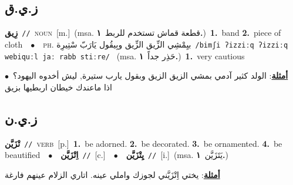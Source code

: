 \documentclass[10pt,a4paper,twoside]{article} %
\begin{document}
\begin{multicols}{2}
\vspace{-3mm}
\subsection*{\color{blue}\foreignlanguage{arabic}{ز.ي.ق}\color{blue}{}} 

{\setlength\topsep{0pt}\textbf{\foreignlanguage{arabic}{زِيق}}\ {\color{gray}\texttt{//}\color{black}}\ \textsc{noun}\ [m.]\ \color{gray}(msa. \foreignlanguage{arabic}{قطعة قماش تستخدم للربط}~\foreignlanguage{arabic}{\textbf{١.}})\color{black}\ \textbf{1.}~band  \textbf{2.}~piece of cloth\ \ $\bullet$\ \ \textsc{ph.} \color{gray} \foreignlanguage{arabic}{بيِمْشِي الزِّيق الزِّيق وبِيقُول يَارَبّ سْتِيرِة}\color{black}\ {\color{gray}\texttt{/{\sffamily bimʃi ʔizziːq ʔizziːq webiquːl jaː rabb stiːre}/}\color{black}}\ \color{gray} (msa. \foreignlanguage{arabic}{حَذِر جداً}~\foreignlanguage{arabic}{\textbf{١.}})\color{black}\ \textbf{1.}~very cautious\  \begin{flushright}\color{gray}\foreignlanguage{arabic}{\textbf{\underline{\foreignlanguage{arabic}{أمثلة}}}: الولد كثير آدمي بمشي الزيق الزيق وبقول يارب ستيرة, ليش أخدوه اليهود؟\ $\bullet$\ \  اذا ماعندك خيطان اربطيها بزيق}\end{flushright}\color{black}} \vspace{2mm}

\vspace{-3mm}
\subsection*{\color{blue}\foreignlanguage{arabic}{ز.ي.ن}\color{blue}{}} 

{\setlength\topsep{0pt}\textbf{\foreignlanguage{arabic}{تْزَيَّن}}\ {\color{gray}\texttt{//}\color{black}}\ \textsc{verb}\ [p.]\ \textbf{1.}~be adorned.  \textbf{2.}~be decorated.  \textbf{3.}~be ornamented.  \textbf{4.}~be beautified\ \ $\bullet$\ \ \setlength\topsep{0pt}\textbf{\foreignlanguage{arabic}{اِتْزَيَّن}}\ {\color{gray}\texttt{//}\color{black}}\ [c.]\ \ $\bullet$\ \ \setlength\topsep{0pt}\textbf{\foreignlanguage{arabic}{يِتْزَيَّن}}\ {\color{gray}\texttt{//}\color{black}}\ [i.]\ \color{gray}(msa. \foreignlanguage{arabic}{يَتَزَيَّن}~\foreignlanguage{arabic}{\textbf{١.}})\color{black}\  \begin{flushright}\color{gray}\foreignlanguage{arabic}{\textbf{\underline{\foreignlanguage{arabic}{أمثلة}}}: يختي اِتْزَيَّني لجوزك واملي عينه. اتاري الزلام عينهم فارغة}\end{flushright}\color{black}} \vspace{2mm}


\end{multicols}
\end{document}

